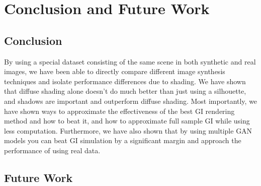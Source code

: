 \documentclass[10pt,twocolumn,letterpaper]{article}
\begin{document}
\section{Conclusion and Future Work}
\subsection{Conclusion}

By using a special dataset consisting of the same scene in both synthetic and real images, we have been able to directly compare different image synthesis techniques and isolate performance differences due to shading.  We have shown that diffuse shading alone doesn't do much better than just using a silhouette, and shadows are important and outperform diffuse shading.  Most importantly, we have shown ways to approximate the effectiveness of the best GI rendering method and how to beat it,  and how to approximate full sample GI while using less computation. Furthermore, we have also shown that by using multiple GAN models you can beat GI simulation by a significant margin and approach the performance of using real data. 

\subsection{Future Work}
\end{document}
